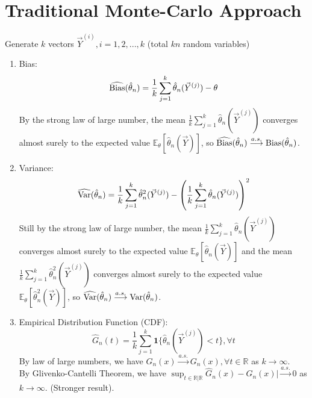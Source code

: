 \documentclass[11pt]{elegantbook}
\begin{document}
\section{Traditional Monte-Carlo Approach}
Generate $k$ vectors $\vec{Y}^{(i)},i=1,2,...,k$ (total $kn$ random variables)
\begin{enumerate}[(1).]
    \item Bias: $$\widehat{\textnormal{Bias}}(\hat{\theta}_n)=\frac{1}{k}\sum_{j=1}^k \hat{\theta}_n(\vec{Y}^{(j)})-\theta$$
    By the strong law of large number, the mean $\frac{1}{k}\sum_{j=1}^k \hat{\theta}_n(\vec{Y}^{(j)})$ converges almost surely to the expected value $\mathbb{E}_{\theta}[\hat{\theta}_n(\vec{Y})]$, so $\widehat{\textnormal{Bias}}(\hat{\theta}_n) \stackrel{a.s.}{\longrightarrow} \textnormal{Bias}(\hat{\theta}_n)$.
    \item Variance: $$\widehat{\textnormal{Var}}(\hat{\theta}_n)=\frac{1}{k}\sum_{j=1}^k \hat{\theta}^2_n(\vec{Y}^{(j)})-\left(\frac{1}{k}\sum_{j=1}^k \hat{\theta}_n(\vec{Y}^{(j)})\right)^2$$
    Still by the strong law of large number, the mean $\frac{1}{k}\sum_{j=1}^k \hat{\theta}_n(\vec{Y}^{(j)})$ converges almost surely to the expected value $\mathbb{E}_{\theta}[\hat{\theta}_n(\vec{Y})]$ and the mean $\frac{1}{k}\sum_{j=1}^k \hat{\theta}^2_n(\vec{Y}^{(j)})$ converges almost surely to the expected value $\mathbb{E}_{\theta}[\hat{\theta}^2_n(\vec{Y})]$, so $\widehat{\textnormal{Var}}(\hat{\theta}_n) \stackrel{a.s.}{\longrightarrow} \textnormal{Var}(\hat{\theta}_n)$.
    \item Empirical Distribution Function (CDF): $$\hat{G}_{n}(t)=\frac{1}{k}\sum_{j=1}^k \mathbf{1}\{\hat{\theta}_n(\vec{Y}^{(j)})<t\},\forall t$$
    By law of large numbers, we have $\hat{G}_n(x) \stackrel{a.s.}{\longrightarrow} G_n(x),\forall t\in \mathbb{R}$ as $k \rightarrow \infty$.\\
    By Glivenko-Cantelli Theorem, we have $\sup_{t\in \mathbb{R} |\mathbb{R}}\hat{G}_n(x) - G_n(x)| \stackrel{a.s.}{\longrightarrow} 0$ as $k \rightarrow \infty$. (Stronger result).
\end{enumerate}
\end{document}
